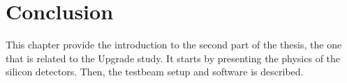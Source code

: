\chapter{Conclusion}


This chapter provide the introduction to the second part of the thesis, the one that is related to the Upgrade study. It starts by presenting the physics of the silicon detectors. Then, the testbeam setup and software is described.  

